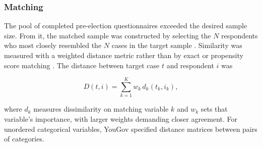 \documentclass[12pt]{article}
\begin{document}
\begin{table}[!htbp]
  \centering
  \footnotesize
  \caption{Non-YouGov Panelist Providers}
  \label{tab:externalproviders}
\end{table}

\subsubsection*{Matching}
The pool of completed pre-election questionnaires exceeded the desired sample size. From it, the matched sample was constructed by selecting the $N$ respondents who most closely resembled the $N$ cases in the target sample \parencite{rivers_sampling_2007}. Similarity was measured with a weighted distance metric rather than by exact or propensity score matching \parencite{stuart_matching_2010}. The distance between target case $t$ and respondent $i$ was

\[
D(t,i) = \sum_{k=1}^{K} w_{k} \, d_{k}(t_{k}, i_{k}),
\]

where $d_{k}$ measures dissimilarity on matching variable $k$ and $w_{k}$ sets that variable's importance, with larger weights demanding closer agreement. For unordered categorical variables, YouGov specified distance matrices between pairs of categories.
 
\end{document}
